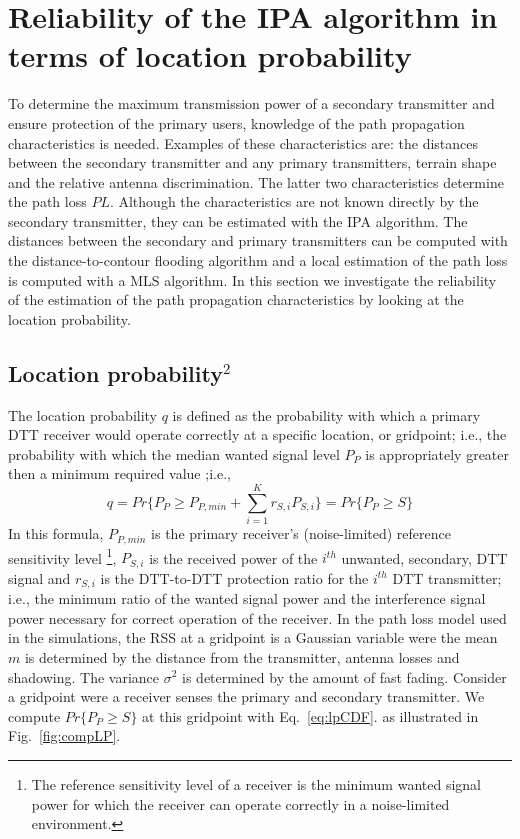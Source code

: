 
\section{Reliability of the IPA algorithm in terms of location probability}\label{sec:contri1}

To determine the maximum transmission power of a secondary transmitter and ensure protection of the primary users, knowledge of the path propagation characteristics is needed. Examples of these characteristics are: the distances between the secondary transmitter and any primary transmitters, terrain shape and the relative antenna discrimination. The latter two characteristics determine the path loss $PL$. Although the characteristics are not known directly by the secondary transmitter, they can be estimated with the IPA algorithm. The distances between the secondary and primary transmitters can be computed with the distance-to-contour flooding algorithm and a local estimation of the path loss is computed with a MLS algorithm. In this section we investigate the reliability of the estimation of the path propagation characteristics by looking at the location probability.

\subsection[title]{Location probability$^2$}

\setcounter{footnote}{2}

The location probability $q$ is defined as the probability with which a primary DTT receiver would operate correctly at a specific location, or gridpoint; i.e., the probability with which the median wanted signal level $P_P$ is appropriately greater then a minimum required value ;i.e.,
\begin{equation} \label{eq:lp}
q=Pr\{P_P\geq P_{P,min}+\sum_{i=1}^K r_{S,i}P_{S,i}\}=Pr\{P_P\geq S\} 
\end{equation}
In this formula, $P_{P,min}$ is the primary receiver's (noise-limited) reference sensitivity level \footnote{The reference sensitivity level of a receiver is the minimum wanted signal power for which the receiver can operate correctly in a noise-limited environment.}, $P_{S,i}$ is the received power of the $i^{th}$ unwanted, secondary, DTT signal and $r_{S,i}$ is the DTT-to-DTT protection ratio for the $i^{th}$ DTT transmitter; i.e., the minimum ratio of the wanted signal power and the interference signal power necessary for correct operation of the receiver. In the path loss model used in the simulations, the RSS at a gridpoint is a Gaussian variable were the mean $m$ is determined by the distance from the transmitter, antenna losses and shadowing. The variance $\sigma^2$ is determined by the amount of fast fading. Consider a gridpoint were a receiver senses the primary and secondary transmitter. We compute $Pr\{P_P\geq S\}$ at this gridpoint with Eq.~\ref{eq:lpCDF}.  as illustrated in Fig.~\ref{fig:compLP}. 


